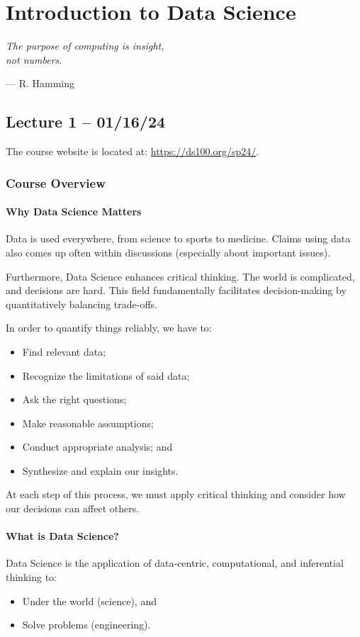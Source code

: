 \documentclass[openany]{book}
\begin{document}
\mytoc

\newpage

\chapter{Introduction to Data Science}
\epigraph{\textit{The purpose of computing is insight,\\not numbers.}}{--- R. Hamming}

\section{Lecture 1 -- 01/16/24}
The course website is located at: \url{https://ds100.org/sp24/}.

\subsection{Course Overview}

\subsubsection{Why Data Science Matters}
Data is used everywhere, from science to sports to medicine. Claims using data also comes up often within discussions (especially about important issues).

Furthermore, Data Science enhances critical thinking. The world is complicated, and decisions are hard. This field fundamentally facilitates decision-making by quantitatively balancing trade-offs.

In order to quantify things reliably, we have to:
\begin{itemize}
	\item Find relevant data;
	\item Recognize the limitations of said data;
	\item Ask the right questions;
	\item Make reasonable assumptions;
	\item Conduct appropriate analysis; and
	\item Synthesize and explain our insights.
\end{itemize}

At each step of this process, we must apply critical thinking and consider how our decisions can affect others.

\newpage

\subsubsection{What is Data Science?}
\begin{defn}\label{def: data science}
	Data Science is the application of data-centric, computational, and inferential thinking to:
	\begin{itemize}
		\item Under the world (science), and
		\item Solve problems (engineering).
	\end{itemize}
\end{defn}
\end{document}
